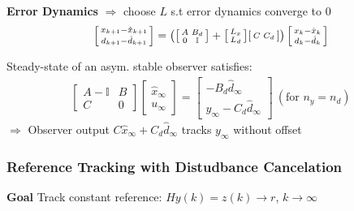 \textbf{Error Dynamics} $\Rightarrow$
choose $L$ s.t error dynamics converge to $0$
\begin{align*}
	\begin{bsmallmatrix}
		x_{k+1} - \hat{x}_{k+1} \\
		d_{k+1} - \hat{d}_{k+1}
	\end{bsmallmatrix}
	= \left(
	\begin{bsmallmatrix}
		A & B_d        \\
		0 & \mathbb{I}
	\end{bsmallmatrix}
	+
	\begin{bsmallmatrix}
		L_x \\
		L_d
	\end{bsmallmatrix}
	\begin{bsmallmatrix}
		C & C_d
	\end{bsmallmatrix}
	\right)
	\begin{bsmallmatrix}
		x_{k} - \hat{x}_{k} \\
		d_{k} - \hat{d}_{k}
	\end{bsmallmatrix}
\end{align*}

\begin{lemma}
	Steady-state of an asym. stable
	observer satisfies:
	\begin{align*}
		\begin{bmatrix}
			A-\mathbb{I} & B \\
			C            & 0
		\end{bmatrix}
		\begin{bmatrix}
			\hat{x}_\infty \\
			u_\infty
		\end{bmatrix}
		=
		\begin{bmatrix}
			-B_d \hat{d}_\infty \\
			y_\infty - C_d \hat{d}_\infty
		\end{bmatrix}
		\ (\text{for }n_y = n_d)
	\end{align*}
	$\Rightarrow$ Observer output $C\hat{x}_\infty + C_d \hat{d}_\infty$ tracks $y_\infty$ without offset
\end{lemma}

\subsubsection{Reference Tracking with Distudbance Cancelation}


\textbf{Goal}
Track constant reference:
$Hy(k) = z(k) \to r$, $k\to\infty$

